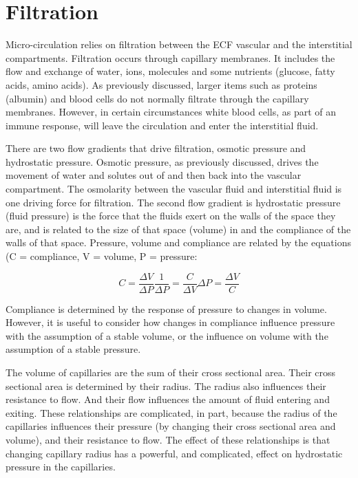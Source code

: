 \section{Filtration}

Micro-circulation relies on filtration between the ECF vascular and the interstitial compartments. Filtration occurs through capillary membranes. It includes the flow and exchange of water, ions, molecules and some nutrients (glucose, fatty acids, amino acids). As previously discussed, larger items such as proteins (albumin) and blood cells do not normally filtrate through the capillary membranes. However, in certain circumstances white blood cells, as part of an immune response, will leave the circulation and enter the interstitial fluid.

There are two flow gradients that drive filtration, osmotic pressure and hydrostatic pressure. Osmotic pressure, as previously discussed, drives the movement of water and solutes out of and then back into the vascular compartment. The osmolarity between the vascular fluid and interstitial fluid is one driving force for filtration. The second flow gradient is hydrostatic pressure (fluid pressure) is the force that the fluids exert on the walls of the space they are, and is related to the size of that space (volume) in and the compliance of the walls of that space. Pressure, volume and compliance are related by the equations (C = compliance, V = volume, P = pressure:

\begin{equation}
    C = \frac{\Delta V}{\Delta P}
    \frac{1}{\Delta P} = \frac{C}{\Delta V}
    \Delta P = \frac{\Delta V}{C}
\end{equation}

Compliance is determined by the response of pressure to changes in volume. However, it is useful to consider how changes in compliance influence pressure with the assumption of a stable volume, or the influence on volume with the assumption of a stable pressure.

The volume of capillaries are the sum of their cross sectional area. Their cross sectional area is determined by their radius. The radius also influences their resistance to flow. And their flow influences the amount of fluid entering and exiting. These relationships are complicated, in part, because the radius of the capillaries influences their pressure (by changing their cross sectional area and volume), and their resistance to flow. The effect of these relationships is that changing capillary radius has a powerful, and complicated, effect on hydrostatic pressure in the capillaries.


